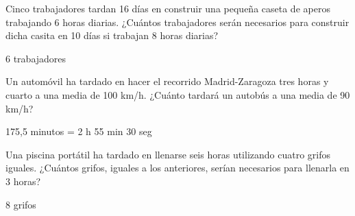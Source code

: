 \documentclass[addpoints,spanish, 12pt,a4paper]{exam}
\begin{document}
\begin{questions}



\question[3] Cinco trabajadores tardan 16 días en construir una pequeña caseta de aperos  trabajando  6  horas  diarias.  ¿Cuántos  trabajadores  serán necesarios para construir dicha casita en 10 días si trabajan 8 horas diarias?
\begin{solution}
6 trabajadores
\end{solution}
\question [3] Un automóvil ha tardado en hacer el recorrido Madrid-Zaragoza tres horas y cuarto a una media de 100 km/h. ¿Cuánto tardará un autobús a una media de 90 km/h?
\begin{solution}
175,5 minutos = 2 h 55 min 30 seg 
\end{solution}

\question [3] Una  piscina  portátil  ha  tardado  en  llenarse  seis  horas  utilizando cuatro  grifos iguales. ¿Cuántos grifos, iguales a los anteriores, serían necesarios para llenarla en 3 horas?
\begin{solution}
8 grifos 
\end{solution}



\end{questions}
\end{document}
